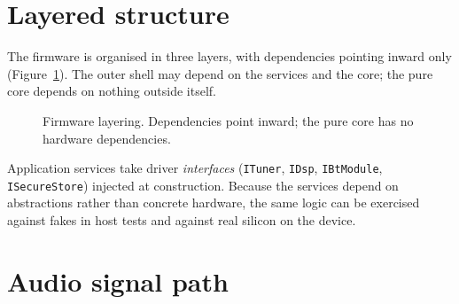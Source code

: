 \section{Layered structure}
\label{sec:fw-layers}

The firmware is organised in three layers, with dependencies pointing
inward only (Figure~\ref{fig:fw-layers}). The outer shell may depend on
the services and the core; the pure core depends on nothing outside
itself.

\begin{figure}[htbp]
  \centering
  \caption{Firmware layering. Dependencies point inward; the pure core
    has no hardware dependencies.}
  \label{fig:fw-layers}
\end{figure}

Application services take driver \emph{interfaces}
(\texttt{ITuner}, \texttt{IDsp}, \texttt{IBtModule},
\texttt{ISecureStore}) injected at construction. Because the services
depend on abstractions rather than concrete hardware, the same logic can
be exercised against fakes in host tests and against real silicon on the
device.

\section{Audio signal path}
\label{sec:fw-audio}

